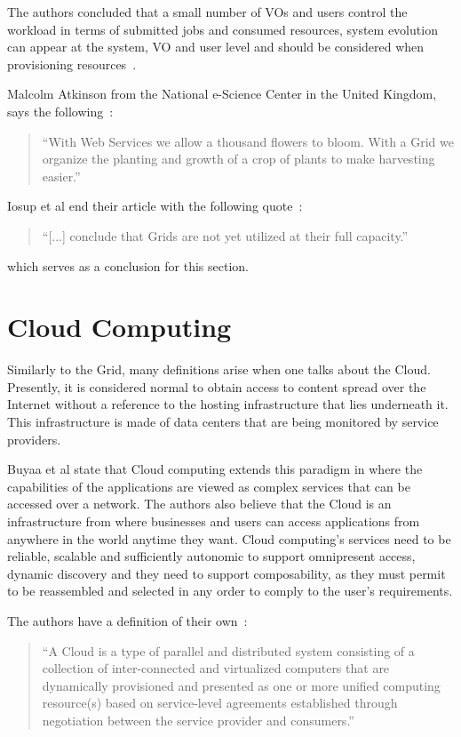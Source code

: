 The authors concluded that a small number of VOs and users control the workload in terms of submitted jobs and consumed resources, system evolution can appear at the system, VO and user level and should be considered when provisioning resources~\cite{iosup}.

Malcolm Atkinson from the National e-Science Center in the United Kingdom, says the following~\cite{stockinger}:
\begin{quote}
``With Web Services we allow a thousand flowers to bloom. With a Grid we organize the planting and growth of a crop of plants to make harvesting easier.''
\end{quote}

Iosup et al end their article with the following quote~\cite{iosup}:

\begin{quote}
``[...] conclude that Grids are not yet utilized at their full capacity.''
\end{quote}

which serves as a conclusion for this section.

\section{Cloud Computing} \label{sec:cloud}

Similarly to the Grid, many definitions arise when one talks about the Cloud. Presently, it is considered normal to obtain access to content spread over the Internet without a reference to the hosting infrastructure that lies underneath it. This infrastructure is made of data centers that are being monitored by service providers. 

Buyaa et al state that Cloud computing extends this paradigm in where the capabilities of the applications are viewed as complex services that can be accessed over a network. The authors also believe that the Cloud is an infrastructure from where businesses and users can access applications from anywhere in the world anytime they want. Cloud computing's services need to be reliable, scalable and sufficiently autonomic to support omnipresent access, dynamic discovery and they need to support composability, as they must permit to be reassembled and selected in any order to comply to the user's requirements.

The authors have a definition of their own~\cite{Buyya2009599}:

\begin{quote}
``A Cloud is a type of parallel and distributed system consisting of a collection of inter-connected and virtualized computers that are dynamically provisioned and presented as one or more unified computing resource(s) based on service-level agreements established through negotiation between the service provider and consumers.'' 
\end{quote}

